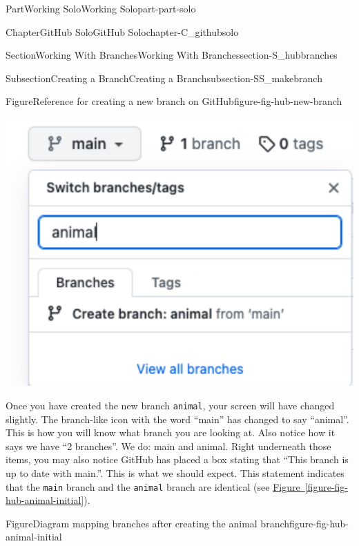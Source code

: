 \documentclass[oneside,10pt,]{book}
\newcommand{\xreffont}{\relax}
\newcommand{\mono}[1]{\texttt{#1}}
\begin{document}
\begin{partptx}{Part}{Working Solo}{}{Working Solo}{}{}{part-part-solo}
\begin{chapterptx}{Chapter}{GitHub Solo}{}{GitHub Solo}{}{}{chapter-C_githubsolo}
\begin{sectionptx}{Section}{Working With Branches}{}{Working With Branches}{}{}{section-S_hubbranches}
\begin{subsectionptx}{Subsection}{Creating a Branch}{}{Creating a Branch}{}{}{subsection-SS_makebranch}
\begin{figureptx}{Figure}{Reference for creating a new branch on GitHub}{figure-fig-hub-new-branch}{}
\begin{sidebyside}{2}{0}{0}{0}
\begin{sbspanel}{0.5}
\includegraphics[width=\linewidth]{external/hub_new_branch_animal.pdf}
\end{sbspanel}%
\end{sidebyside}%
\tcblower
\end{figureptx}%
Once you have created the new branch \mono{animal}, your screen will have changed slightly. The branch-like icon with the word ``main'' has changed to say ``animal''. This is how you will know what branch you are looking at. Also notice how it says we have ``2 branches''. We do: main and animal. Right underneath those items, you may also notice GitHub has placed a box stating that ``This branch is up to date with main.''. This is what we should expect. This statement indicates that the \mono{main} branch and the \mono{animal} branch are identical (see \hyperref[figure-fig-hub-animal-initial]{Figure~{\xreffont\ref{figure-fig-hub-animal-initial}}}).%
\begin{figureptx}{Figure}{Diagram mapping branches after creating the animal branch}{figure-fig-hub-animal-initial}{}%
\begin{image}{0.15}{0.7}{0.15}{}%

\end{image}
\end{figureptx}
\end{subsectionptx}
\end{sectionptx}
\end{chapterptx}
\end{partptx}
\end{document}
